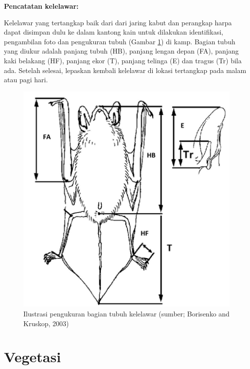 \documentclass[
  oneside]{book}
\begin{document}
\textbf{Pencatatan kelelawar:}

Kelelawar yang tertangkap baik dari dari jaring kabut dan perangkap harpa dapat disimpan dulu ke dalam kantong kain untuk dilakukan identifikasi, pengambilan foto dan pengukuran tubuh (Gambar \ref{fig:kelmor}) di kamp. Bagian tubuh yang diukur adalah panjang tubuh (HB), panjang lengan depan (FA), panjang kaki belakang (HF), panjang ekor (T), panjang telinga (E) dan tragus (Tr) bila ada. Setelah selesai, lepaskan kembali kelelawar di lokasi tertangkap pada malam atau pagi hari.

\begin{figure}

{\centering \includegraphics[width=1\linewidth]{images/kfm_ilustration} 

}

\caption{Ilustrasi pengukuran bagian tubuh kelelawar (sumber; Borisenko and Kruskop, 2003)}\label{fig:kelmor}
\end{figure}

\hypertarget{vegetasi}{%
\section*{Vegetasi}\label{vegetasi}}
\end{document}

